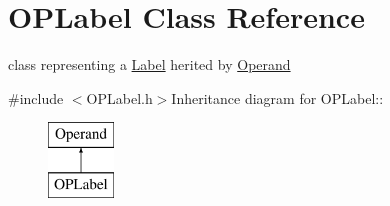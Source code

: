 \hypertarget{classOPLabel}{
\section{OPLabel Class Reference}
\label{classOPLabel}
}


class representing a \hyperlink{classLabel}{Label} herited by \hyperlink{classOperand}{Operand}  


{\ttfamily \#include $<$OPLabel.h$>$}Inheritance diagram for OPLabel::\begin{figure}[H]
\begin{center}
\leavevmode
\includegraphics[height=2cm]{classOPLabel}
\end{center}
\end{figure}
